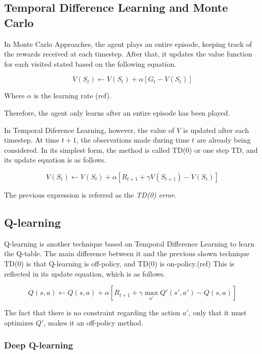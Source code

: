 \documentclass[11pt,twoside]{article}
\begin{document}
\subsection{Temporal Difference Learning and Monte Carlo}

In Monte Carlo Approaches, the agent plays an entire episode, keeping track of the rewards received at each timestep. After that, it updates the value function for each visited stated based on the following equation.

\begin{equation} \label{eq:4}
	V(S_t) \leftarrow V(S_t) + \alpha [G_t - V(S_t)]
\end{equation}

Where $\alpha$ is the learning rate (ref).

Therefore, the agent only learns after an entire episode has been played.

In Temporal Diference Learning, however, the value of $V$ is updated after each timestep. At time $t+1$, the observations made during time $t$ are already being considered. In its simplest form, the method is called TD(0) or one step TD, and its update equation is as follows.

\begin{equation} \label{eq:5}
	V(S_t) \leftarrow V(S_t) + \alpha [R_{t+1} + \gamma V(S_{t+1}) - V(S_t)]
\end{equation}

The previous expression is referred as the \textit{TD(0) error}.

\subsection{Q-learning}

Q-learning is another technique based on Temporal Difference Learning to learn the Q-table. The main difference between it and the previous shown technique TD(0) is that Q-learning is off-policy, and TD(0) is on-policy.(ref) This is reflected in its update equation, which is as follows.

\begin{equation} \label{eq:6}
	Q(s, a) \leftarrow Q(s, a) + \alpha [R_{t+1} + \gamma \max_{a'} Q'(s', a') - Q(s,a)]
\end{equation}

The fact that there is no constraint regarding the action $a'$, only that it must optimizes $Q'$, makes it an off-policy method.


\subsubsection{Deep Q-learning}
\end{document}
